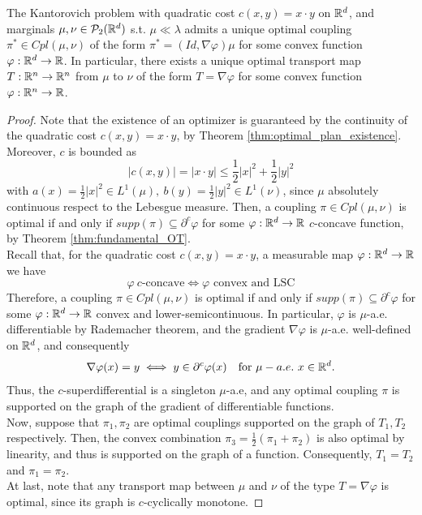 \documentclass[../main.tex]{subfiles}
\begin{document}
\begin{theorem}
    The Kantorovich problem with quadratic cost $c(x, y) = x\cdot y$ on $\mathbb{R}^d$, and marginals $\mu, \nu\in\mathcal{P}_2(\mathbb{R}^d)$ s.t. $\mu\ll\lambda$ admits a unique optimal coupling $\pi^*\in Cpl(\mu, \nu)$ of the form $\pi^* = (Id, \nabla\varphi)\mu$ for some convex function $\varphi: \mathbb{R}^d \to \mathbb{R}$. In particular, there exists a unique optimal transport map $T: \mathbb{R}^n \to \mathbb{R}^n$ from $\mu$ to $\nu$ of the form $T=\nabla\varphi$ for some convex function $\varphi: \mathbb{R}^n\to\mathbb{R}$.    
\end{theorem}
\begin{proof}
    Note that the existence of an optimizer is guaranteed by the continuity of the quadratic cost $c(x, y) = x\cdot y$, by Theorem \ref{thm:optimal_plan_existence}. Moreover, $c$ is bounded as
    $$
    |c(x,y)| = |x\cdot y| \leq \frac{1}{2}|x|^2 + \frac{1}{2}|y|^2
    $$
    with $a(x)=\frac{1}{2}|x|^2\in L^1(\mu), \ b(y)=\frac{1}{2}|y|^2\in L^1(\nu)$, since $\mu$ absolutely continuous respect to the Lebesgue measure. Then, a coupling $\pi\in Cpl(\mu, \nu)$ is optimal if and only if $supp(\pi)\subseteq \partial^c \varphi$ for some $\varphi:\mathbb{R}^d \to \mathbb{R}$ $c$-concave function, by Theorem \ref{thm:fundamental_OT}. \\
    Recall that, for the quadratic cost $c(x, y)=x\cdot y$, a measurable map $\varphi: \mathbb{R}^d\to\mathbb{R}$ we have
    $$
    \varphi \ c\text{-concave} \iff \varphi \text{ convex and LSC}
    $$
    Therefore, a coupling $\pi\in Cpl(\mu, \nu)$ is optimal if and only if $supp(\pi)\subseteq \partial^c\varphi$ for some $\varphi:\mathbb{R}^d\to \mathbb{R}$ convex and lower-semicontinuous. In particular, $\varphi$ is $\mu$-a.e. differentiable by Rademacher theorem, and the gradient $\nabla\varphi$ is $\mu$-a.e. well-defined on $\mathbb{R}^d$, and consequently
    $$
    \nabla\varphi(x) = y \iff y\in\partial^c\varphi(x) \quad \text{for } \mu-a.e. \ x\in\mathbb{R}^d.
    $$
    Thus, the $c$-superdifferential is a singleton $\mu$-a.e, and any optimal coupling $\pi$ is supported on the graph of the gradient of differentiable functions. \\
    Now, suppose that $\pi_1, \pi_2$ are optimal couplings supported on the graph of $T_1, T_2$ respectively. Then, the convex combination $\pi_3 = \frac{1}{2}(\pi_1 + \pi_2)$ is also optimal by linearity, and thus is supported on the graph of a function. Consequently, $T_1 = T_2$ and $\pi_1 = \pi_2$. \\
    At last, note that any transport map between $\mu$ and $\nu$ of the type $T=\nabla\varphi$ is optimal, since its graph is $c$-cyclically monotone.
\end{proof}
\end{document}
